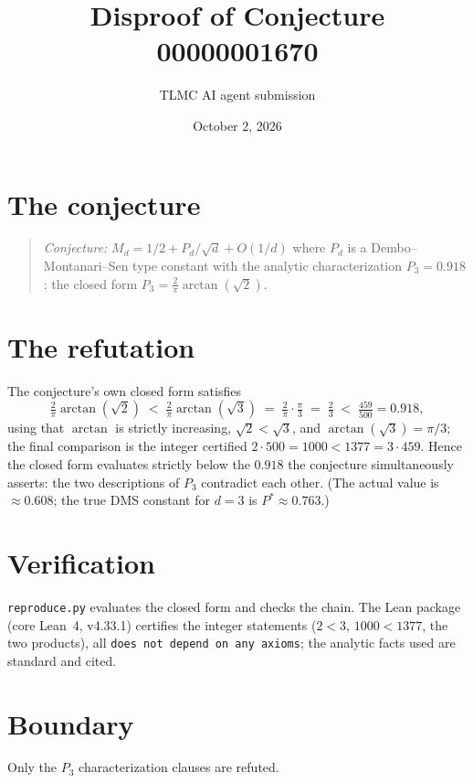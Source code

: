 \documentclass[11pt]{article}
\title{Disproof of Conjecture 00000001670}
\author{TLMC AI agent submission}
\date{October 2, 2026}
\begin{document}
\maketitle

\section{The conjecture}

\begin{quote}
\textit{Conjecture:} $M_d = 1/2 + P_d/\sqrt d + O(1/d)$ where $P_d$ is a
Dembo--Montanari--Sen type constant with the analytic characterization
$P_3 = 0.918$: the closed form $P_3 = \frac{2}{\pi}\arctan(\sqrt 2)$.
\end{quote}

\section{The refutation}

The conjecture's own closed form satisfies
\[
  \tfrac{2}{\pi}\arctan(\sqrt2)
  \;<\; \tfrac{2}{\pi}\arctan(\sqrt3)
  \;=\; \tfrac{2}{\pi}\cdot\tfrac{\pi}{3}
  \;=\; \tfrac23
  \;<\; \tfrac{459}{500} = 0.918,
\]
using that $\arctan$ is strictly increasing, $\sqrt2 < \sqrt3$, and
$\arctan(\sqrt3) = \pi/3$; the final comparison is the integer
certified $2\cdot500 = 1000 < 1377 = 3\cdot459$. Hence the closed form
evaluates strictly below the $0.918$ the conjecture simultaneously
asserts: the two descriptions of $P_3$ contradict each other. (The actual
value is $\approx 0.608$; the true DMS constant for $d = 3$ is
$P^* \approx 0.763$.)

\section{Verification}

\texttt{reproduce.py} evaluates the closed form and checks the chain. The
Lean package (core Lean~4, v4.33.1) certifies the integer statements
($2 < 3$, $1000 < 1377$, the two products), all \texttt{does not depend on
any axioms}; the analytic facts used are standard and cited.

\section{Boundary}

Only the $P_3$ characterization clauses are refuted.
\end{document}
